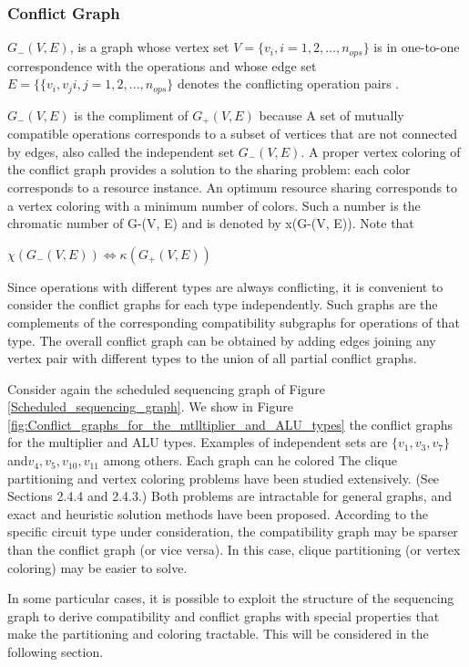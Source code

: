 \subsubsection{Conflict Graph}
$G_{-}(V,E)  $,  is a graph whose vertex set $  V = \{v_{i}, i = 1,2,..., n_{ops}\} $ is in one-to-one correspondence with the operations and whose edge set $ E = \{\{v_{i},v_{j} i,j = 1,2,...,n_{ops}\}$ denotes the conflicting operation pairs \cite{b1}. 

$G_{-}(V,E) $ is the compliment of $G_{+}(V,E)  $ because A set of mutually compatible operations corresponds to a subset of vertices that are not connected by edges, also called the independent set $G_{-}(V,E)  $. A proper vertex coloring of the conflict graph provides a solution to the sharing problem: each color corresponds to a resource instance. An optimum resource sharing corresponds to a vertex coloring with a minimum number of colors. Such a number is the chromatic number of G-(V, E) and is denoted by x(G-(V, E)). Note that 
\begin{center}
$\chi(G_{-}(V,E))  \Leftrightarrow \kappa(G_{+}(V,E)) $
\end{center}

Since operations with different types are always conflicting, it is convenient to consider the conflict graphs for each type independently. Such graphs are the complements of the corresponding compatibility subgraphs for operations of that type. The overall conflict graph can be obtained by adding edges joining any vertex pair with different types to the union of all partial conflict graphs. 

Consider again the scheduled sequencing graph of Figure \ref{Scheduled_sequencing_graph}. We show in Figure \ref{fig:Conflict_graphs_for_the_mtlltiplier_and_ALU_types} the conflict graphs for the multiplier and ALU types. Examples of independent sets are $\{v_{1},v_{3},v_{7}\}  $and$ v_{4},v_{5},v_{10},v_{11} $ among others. Each graph can he colored The clique partitioning and vertex coloring problems have been studied extensively. (See Sections 2.4.4 and 2.4.3.) Both problems are intractable for general graphs, and exact and heuristic solution methods have been proposed. According to the specific circuit type under consideration, the compatibility graph may be sparser than the conflict graph (or vice versa). In this case, clique partitioning (or vertex coloring) may be easier to solve. 

In some particular cases, it is possible to exploit the structure of the sequencing 
graph to derive compatibility and conflict graphs with special properties that make the 
partitioning and coloring tractable. This will be considered in the following section.

